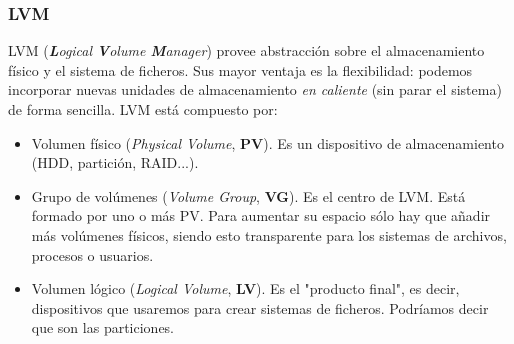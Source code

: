 \documentclass[12pt,spanish]{article}
\begin{document}
\newpage

\subsubsection{LVM}
LVM (\textit{\textbf{L}ogical \textbf{V}olume \textbf{M}anager}) provee abstracción sobre el almacenamiento físico y el sistema de ficheros. Sus mayor ventaja es la flexibilidad: podemos incorporar nuevas unidades de almacenamiento \textit{en caliente} (sin parar el sistema) de forma sencilla. LVM está compuesto por:
\begin{itemize}
  \item Volumen físico (\textit{Physical Volume}, \textbf{PV}). Es un dispositivo de almacenamiento (HDD, partición, RAID...).
  \item Grupo de volúmenes (\textit{Volume Group}, \textbf{VG}). Es el centro de LVM. Está formado por uno o más PV. Para aumentar su espacio sólo hay que añadir más volúmenes físicos, siendo esto transparente para los sistemas de archivos, procesos o usuarios.
  \item Volumen lógico (\textit{Logical Volume}, \textbf{LV}). Es el "producto final", es decir, dispositivos que usaremos para crear sistemas de ficheros. Podríamos decir que son las particiones.
\end{itemize}
\end{document}
